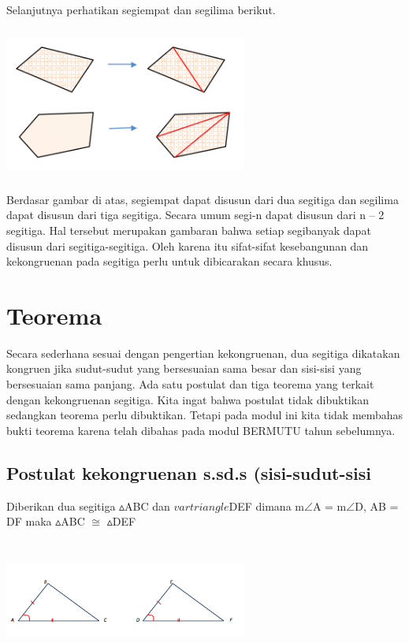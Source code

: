 \documentclass[11pt,fleqn]{book} %
\begin{document}
\paragraph{}


Selanjutnya perhatikan segiempat dan segilima berikut. 

\includegraphics[width = 8cm, height= 5cm]{Pictures/3.png}

Berdasar gambar di atas, segiempat dapat disusun dari dua segitiga dan segilima
dapat disusun dari tiga segitiga. Secara umum segi-n dapat disusun dari n – 2 segitiga.
Hal tersebut merupakan gambaran bahwa setiap segibanyak dapat disusun dari segitiga-segitiga. Oleh karena itu sifat-sifat kesebangunan dan kekongruenan pada
segitiga perlu untuk dibicarakan secara khusus. 

\section{Teorema}

Secara sederhana sesuai dengan pengertian kekongruenan, dua segitiga dikatakan
kongruen jika sudut-sudut yang bersesuaian sama besar dan sisi-sisi yang bersesuaian
sama panjang. Ada satu postulat dan tiga teorema yang terkait dengan kekongruenan
segitiga. Kita ingat bahwa postulat tidak dibuktikan sedangkan teorema perlu
dibuktikan. Tetapi pada modul ini kita tidak membahas bukti teorema karena telah
dibahas pada modul BERMUTU tahun sebelumnya. 

\subsection{Postulat kekongruenan s.sd.s (sisi-sudut-sisi}


\begin{theorem}

Diberikan dua segitiga $\vartriangle $ABC dan $vartriangle $DEF dimana m$\angle$A = m$\angle$D, AB = DF maka $\vartriangle $ABC $\cong$ $\vartriangle $DEF
\end{theorem}
\includegraphics[width = 8cm, height= 4cm]{Pictures/4.png}
\end{document}
